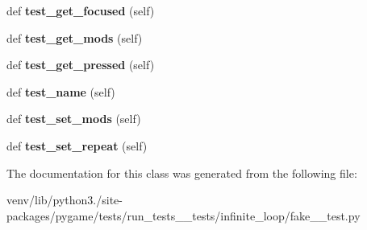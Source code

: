 \begin{DoxyCompactItemize}
\item 
\mbox{\label{classpygame_1_1tests_1_1run__tests____tests_1_1infinite__loop_1_1fake__1__test_1_1_key_module_test_ab3efe02f35ba90805ad31cf0d16fb5f9}} 
def {\bfseries test\+\_\+get\+\_\+focused} (self)
\item 
\mbox{\label{classpygame_1_1tests_1_1run__tests____tests_1_1infinite__loop_1_1fake__1__test_1_1_key_module_test_a28ff46c30ae8190910e6dbff6ab53692}} 
def {\bfseries test\+\_\+get\+\_\+mods} (self)
\item 
\mbox{\label{classpygame_1_1tests_1_1run__tests____tests_1_1infinite__loop_1_1fake__1__test_1_1_key_module_test_a3d8ee86c1fa390e319925e17d52c4ce2}} 
def {\bfseries test\+\_\+get\+\_\+pressed} (self)
\item 
\mbox{\label{classpygame_1_1tests_1_1run__tests____tests_1_1infinite__loop_1_1fake__1__test_1_1_key_module_test_a9201576b2bb261e175ab9fbef7c52ad6}} 
def {\bfseries test\+\_\+name} (self)
\item 
\mbox{\label{classpygame_1_1tests_1_1run__tests____tests_1_1infinite__loop_1_1fake__1__test_1_1_key_module_test_a121ea1ef73898158b37130946308f7c4}} 
def {\bfseries test\+\_\+set\+\_\+mods} (self)
\item 
\mbox{\label{classpygame_1_1tests_1_1run__tests____tests_1_1infinite__loop_1_1fake__1__test_1_1_key_module_test_a0d6e4d07a27d5e8e029b97edce1041d1}} 
def {\bfseries test\+\_\+set\+\_\+repeat} (self)
\end{DoxyCompactItemize}


The documentation for this class was generated from the following file\+:\begin{DoxyCompactItemize}
\item 
venv/lib/python3./site-\/packages/pygame/tests/run\+\_\+tests\+\_\+\+\_\+tests/infinite\+\_\+loop/fake\+\_\+\_\+test.\+py\end{DoxyCompactItemize}
